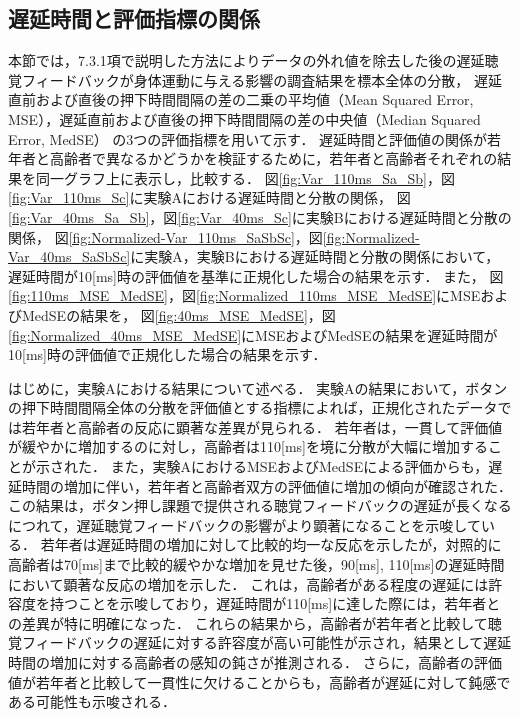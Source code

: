 \subsection{遅延時間と評価指標の関係}
本節では，7.3.1項で説明した方法によりデータの外れ値を除去した後の遅延聴覚フィードバックが身体運動に与える影響の調査結果を標本全体の分散，
遅延直前および直後の押下時間間隔の差の二乗の平均値（Mean Squared Error, MSE），遅延直前および直後の押下時間間隔の差の中央値（Median Squared Error, MedSE）
の3つの評価指標を用いて示す．
遅延時間と評価値の関係が若年者と高齢者で異なるかどうかを検証するために，若年者と高齢者それぞれの結果を同一グラフ上に表示し，比較する．
図\ref{fig:Var_110ms_Sa_Sb}，図\ref{fig:Var_110ms_Sc}に実験Aにおける遅延時間と分散の関係，
図\ref{fig:Var_40ms_Sa_Sb}，図\ref{fig:Var_40ms_Sc}に実験Bにおける遅延時間と分散の関係，
図\ref{fig:Normalized-Var_110ms_SaSbSc}，図\ref{fig:Normalized-Var_40ms_SaSbSc}に実験A，実験Bにおける遅延時間と分散の関係において，遅延時間が10[ms]時の評価値を基準に正規化した場合の結果を示す．
また，
図\ref{fig:110ms_MSE_MedSE}，図\ref{fig:Normalized_110ms_MSE_MedSE}にMSEおよびMedSEの結果を，
図\ref{fig:40ms_MSE_MedSE}，図\ref{fig:Normalized_40ms_MSE_MedSE}にMSEおよびMedSEの結果を遅延時間が10[ms]時の評価値で正規化した場合の結果を示す．

はじめに，実験Aにおける結果について述べる．
実験Aの結果において，ボタンの押下時間間隔全体の分散を評価値とする指標によれば，正規化されたデータでは若年者と高齢者の反応に顕著な差異が見られる．
若年者は，一貫して評価値が緩やかに増加するのに対し，高齢者は110[ms]を境に分散が大幅に増加することが示された．
また，実験AにおけるMSEおよびMedSEによる評価からも，遅延時間の増加に伴い，若年者と高齢者双方の評価値に増加の傾向が確認された．
この結果は，ボタン押し課題で提供される聴覚フィードバックの遅延が長くなるにつれて，遅延聴覚フィードバックの影響がより顕著になることを示唆している．
若年者は遅延時間の増加に対して比較的均一な反応を示したが，対照的に高齢者は70[ms]まで比較的緩やかな増加を見せた後，90[ms], 110[ms]の遅延時間において顕著な反応の増加を示した．
これは，高齢者がある程度の遅延には許容度を持つことを示唆しており，遅延時間が110[ms]に達した際には，若年者との差異が特に明確になった．
これらの結果から，高齢者が若年者と比較して聴覚フィードバックの遅延に対する許容度が高い可能性が示され，結果として遅延時間の増加に対する高齢者の感知の鈍さが推測される．
さらに，高齢者の評価値が若年者と比較して一貫性に欠けることからも，高齢者が遅延に対して鈍感である可能性も示唆される．

